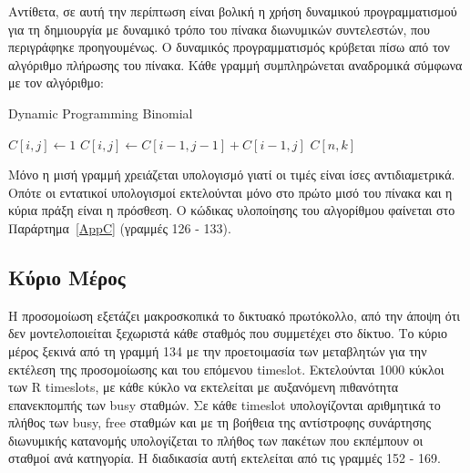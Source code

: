 \documentclass[12pt]{report}
\begin{document}
Αντίθετα, σε αυτή την περίπτωση είναι βολική η χρήση δυναμικού προγραμματισμού για τη δημιουργία με δυναμικό τρόπο του πίνακα διωνυμικών συντελεστών, που περιγράφηκε προηγουμένως. Ο δυναμικός προγραμματισμός κρύβεται πίσω από τον αλγόριθμο πλήρωσης του πίνακα. Κάθε γραμμή συμπληρώνεται αναδρομικά σύμφωνα με τον αλγόριθμο:
\begin{algorithm}[H]
\caption{Dynamic Programming Binomial}
\begin{algorithmic}[1]
      \State $C[i, j] \leftarrow 1$
    \Else
      \State $C[i, j] \leftarrow C[i-1, j-1] + C[i-1, j]$
    \EndIf
  \EndFor
\EndFor
\State \Return $C[n, k]$
\EndFunction
\end{algorithmic}
\end{algorithm}

Μόνο η μισή γραμμή χρειάζεται υπολογισμό γιατί οι τιμές είναι ίσες αντιδιαμετρικά. Οπότε οι εντατικοί υπολογισμοί εκτελούνται μόνο στο πρώτο μισό του πίνακα και η κύρια πράξη είναι η πρόσθεση. Ο κώδικας υλοποίησης του αλγορίθμου φαίνεται στο Παράρτημα~\ref{AppC} (γραμμές 126 - 133).

\subsection{Κύριο Μέρος}
Η προσομοίωση εξετάζει μακροσκοπικά το δικτυακό πρωτόκολλο, από την άποψη ότι δεν μοντελοποιείται ξεχωριστά κάθε σταθμός που συμμετέχει στο δίκτυο. Το κύριο μέρος ξεκινά από τη γραμμή 134 με την προετοιμασία των μεταβλητών για την εκτέλεση της προσομοίωσης και του επόμενου \textlatin{timeslot}. Εκτελούνται 1000 κύκλοι των \textlatin{R timeslots}, με κάθε κύκλο να εκτελείται με αυξανόμενη πιθανότητα επανεκπομπής των \textlatin{busy} σταθμών. Σε κάθε \textlatin{timeslot} υπολογίζονται αριθμητικά το πλήθος των \textlatin{busy, free} σταθμών και με τη βοήθεια της αντίστροφης συνάρτησης διωνυμικής κατανομής υπολογίζεται το πλήθος των πακέτων που εκπέμπουν οι σταθμοί ανά κατηγορία. Η διαδικασία αυτή εκτελείται από τις γραμμές 152 - 169.
\end{document}
